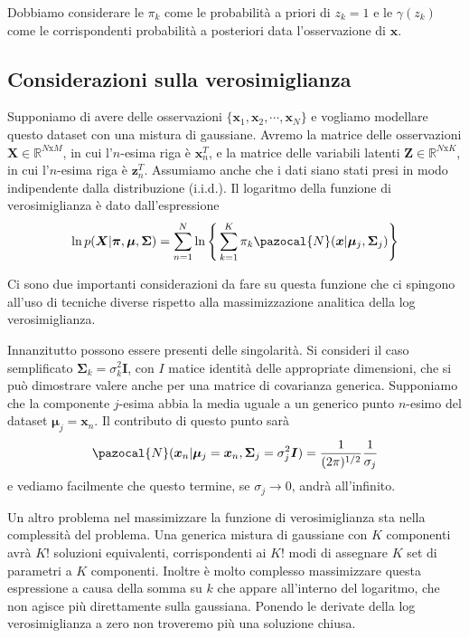 \documentclass{report}
\begin{document}
Dobbiamo considerare le $\pi_k$ come le probabilità a priori di $z_k=1$ e le $\gamma(z_k)$ come le corrispondenti probabilità a posteriori data l'osservazione di $\bm{x}$.

\subsection{Considerazioni sulla verosimiglianza}

Supponiamo di avere delle osservazioni $\{\bm{x}_1,\bm{x}_2,\cdots,\bm{x}_N\}$ e vogliamo modellare questo dataset con una mistura di gaussiane. Avremo la matrice delle osservazioni $\bm{X}\in\mathbb{R}^{N\text{x}M}$, in cui l'$n$-esima riga è $\bm{x}_n^T$, e la matrice delle variabili latenti $\bm{Z}\in\mathbb{R}^{N\text{x}K}$, in cui l'$n$-esima riga è $\bm{z}_n^T$. Assumiamo anche che i dati siano stati presi in modo indipendente dalla distribuzione (i.i.d.). Il logaritmo della funzione di verosimiglianza è dato dall'espressione
\begin{equation}
\ln p(\bm{X}|\bm\pi,\bm\mu,\bm\Sigma) = \sum_{n=1}^N\ln\Bigg\{\sum_{k=1}^K\pi_k\pazocal{N}(\bm{x}|\bm\mu_j, \bm\Sigma_j)\Bigg\}
\end{equation}

Ci sono due importanti considerazioni da fare su questa funzione che ci spingono all'uso di tecniche diverse rispetto alla massimizzazione analitica della log verosimiglianza.

Innanzitutto possono essere presenti delle singolarità. Si consideri il caso semplificato $\bm\Sigma_k = \sigma_k^2\bm{I}$, con $I$ matice identità delle appropriate dimensioni, che si può dimostrare valere anche per una matrice di covarianza generica. Supponiamo che la componente $j$-esima abbia la media uguale a un generico punto $n$-esimo del dataset $\bm\mu_j = \bm{x}_n$. Il contributo di questo punto sarà
\begin{equation}
\pazocal{N}(\bm{x}_n|\bm\mu_j=\bm{x}_n, \bm\Sigma_j=\sigma_j^2\bm{I}) = \frac{1}{(2\pi)^{1/2}}\frac{1}{\sigma_j}
\end{equation}
e vediamo facilmente che questo termine, se $\sigma_j \to 0$, andrà all'infinito.

Un altro problema nel massimizzare la funzione di verosimiglianza sta nella complessità del problema. Una generica mistura di gaussiane con $K$ componenti avrà $K!$ soluzioni equivalenti, corrispondenti ai $K!$ modi di assegnare $K$ set di parametri a $K$ componenti. Inoltre è molto complesso massimizzare questa espressione a causa della somma su $k$ che appare all'interno del logaritmo, che non agisce più direttamente sulla gaussiana. Ponendo le derivate della log verosimiglianza a zero non troveremo più una soluzione chiusa.
\end{document}
